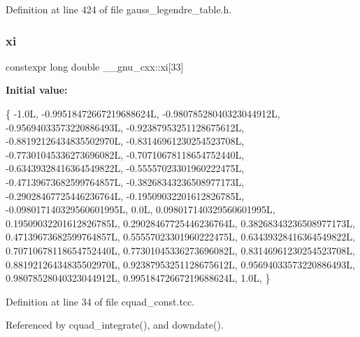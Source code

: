 Definition at line 424 of file gauss\+\_\+legendre\+\_\+table.\+h.

\mbox{\label{namespace____gnu__cxx_a8a912ee89c90a7e5049ce5ffad04274b}} 
\subsubsection{\texorpdfstring{xi}{xi}}
{\footnotesize\ttfamily constexpr long double \+\_\+\+\_\+gnu\+\_\+cxx\+::xi\mbox{[}33\mbox{]}}

{\bfseries Initial value\+:}
\begin{DoxyCode}
\{
  -1.0L,                    -0.99518472667219688624L,
  -0.98078528040323044912L, -0.95694033573220886493L,
  -0.92387953251128675612L, -0.88192126434835502970L,
  -0.83146961230254523708L, -0.77301045336273696082L,
  -0.70710678118654752440L, -0.63439328416364549822L,
  -0.55557023301960222475L, -0.47139673682599764857L,
  -0.38268343236508977173L, -0.29028467725446236764L,
  -0.19509032201612826785L, -0.098017140329560601995L,
   0.0L,                     0.098017140329560601995L,
   0.19509032201612826785L, 0.29028467725446236764L,
   0.38268343236508977173L, 0.47139673682599764857L,
   0.55557023301960222475L, 0.63439328416364549822L,
   0.70710678118654752440L, 0.77301045336273696082L,
   0.83146961230254523708L, 0.88192126434835502970L, 
   0.92387953251128675612L, 0.95694033573220886493L,
   0.98078528040323044912L, 0.99518472667219688624L,
   1.0L,
\}
\end{DoxyCode}


Definition at line 34 of file cquad\+\_\+const.\+tcc.



Referenced by cquad\+\_\+integrate(), and downdate().

